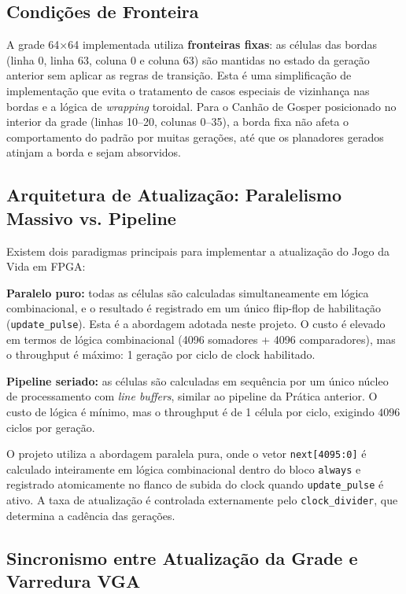 \documentclass[12pt, a4paper]{article}
\begin{document}
	\subsection{Condições de Fronteira}
	
	A grade 64$\times$64 implementada utiliza \textbf{fronteiras fixas}: as células
	das bordas (linha 0, linha 63, coluna 0 e coluna 63) são mantidas no estado da
	geração anterior sem aplicar as regras de transição. Esta é uma simplificação
	de implementação que evita o tratamento de casos especiais de vizinhança nas
	bordas e a lógica de \textit{wrapping} toroidal. Para o Canhão de Gosper
	posicionado no interior da grade (linhas 10--20, colunas 0--35), a borda fixa
	não afeta o comportamento do padrão por muitas gerações, até que os planadores
	gerados atinjam a borda e sejam absorvidos.
	
	\subsection{Arquitetura de Atualização: Paralelismo Massivo vs. Pipeline}
	
	Existem dois paradigmas principais para implementar a atualização do Jogo da
	Vida em FPGA:
	
	\textbf{Paralelo puro:} todas as células são calculadas simultaneamente em
	lógica combinacional, e o resultado é registrado em um único flip-flop de
	habilitação (\texttt{update\_pulse}). Esta é a abordagem adotada neste projeto.
	O custo é elevado em termos de lógica combinacional (4096 somadores + 4096
	comparadores), mas o throughput é máximo: 1 geração por ciclo de clock habilitado.
	
	\textbf{Pipeline seriado:} as células são calculadas em sequência por um único
	núcleo de processamento com \textit{line buffers}, similar ao pipeline da Prática
	anterior. O custo de lógica é mínimo, mas o throughput é de 1 célula por ciclo,
	exigindo $4096$ ciclos por geração.
	
	O projeto utiliza a abordagem paralela pura, onde o vetor \texttt{next[4095:0]}
	é calculado inteiramente em lógica combinacional dentro do bloco \texttt{always}
	e registrado atomicamente no flanco de subida do clock quando \texttt{update\_pulse}
	é ativo. A taxa de atualização é controlada externamente pelo \texttt{clock\_divider},
	que determina a cadência das gerações.
	
	\subsection{Sincronismo entre Atualização da Grade e Varredura VGA}
	
\end{document}
